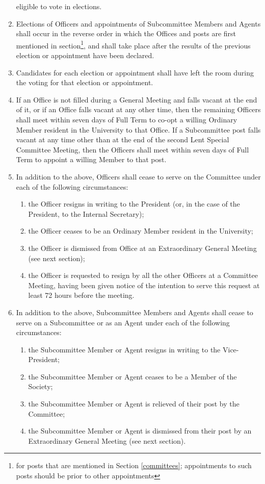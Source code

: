\documentclass{article}
\begin{document}
\begin{enumerate}
eligible to vote in elections.
\item Elections of Officers and appointments of Subcommittee Members and
Agents shall occur in the reverse order in which the Offices and posts are first
mentioned in section\footnote{for posts that are mentioned in Section \ref{committees}; appointments to such posts should be prior to other appointments}, and shall take place after the results of the previous election or appointment have been declared.
\item Candidates for each election or appointment shall have left the room during the voting for that election or appointment.
\item If an Office is not filled during a General Meeting and falls vacant at
the end of it, or if an Office falls vacant at any other time, then the
remaining Officers shall meet within seven days of Full Term to co-opt
a willing Ordinary Member resident in the University to that Office. If
a Subcommittee post falls vacant at any time other than at the end of
the second Lent Special Committee Meeting, then the Officers shall meet
within seven days of Full Term to appoint a willing Member to that post.
\item In addition to the above, Officers shall cease to serve on the Committee
under each of the following circumstances:
  \begin{enumerate}
  \item the Officer resigns in writing to the President (or, in the case of the
  President, to the Internal Secretary);
  \item the Officer ceases to be an Ordinary Member resident in the University;
  \item the Officer is dismissed from Office at an Extraordinary General
  Meeting (see next section);
  \item the Officer is requested to resign by all the other Officers at a Committee Meeting, having been given notice of the intention to serve
  this request at least 72 hours before the meeting.
  \end{enumerate}
\item In addition to the above, Subcommittee Members and Agents shall cease
to serve on a Subcommittee or as an Agent under each of the following
circumstances:
  \begin{enumerate}
  \item the Subcommittee Member or Agent resigns in writing to the Vice-President;
  \item the Subcommittee Member or Agent ceases to be a Member of the
  Society;
  \item the Subcommittee Member or Agent is relieved of their post by the
  Committee;
  \item the Subcommittee Member or Agent is dismissed from their post by
  an Extraordinary General Meeting (see next section).
  \end{enumerate}
\end{enumerate}
\end{document}
